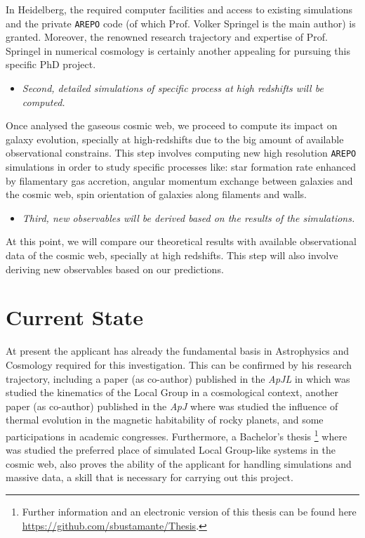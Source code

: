 \documentclass[a4,useAMS,usenatbib,usegraphicx,12pt]{article}
\begin{document}
In Heidelberg, the required computer facilities and access to existing 
simulations and the private \texttt{AREPO} code (of which Prof. Volker 
Springel is the main author) is granted. Moreover, the renowned research 
trajectory and expertise of Prof. Springel in numerical cosmology is 
certainly another appealing for pursuing this specific PhD project.


\begin{itemize}

\item[\checkmark] \textit{Second, detailed simulations of specific process at
high redshifts will be computed.}

\end{itemize}


Once analysed the gaseous cosmic web, we proceed to compute its impact on 
galaxy evolution, specially at high-redshifts due to the big amount of 
available observational constrains. This step involves computing new high 
resolution \texttt{AREPO} simulations in order to study specific processes 
like: star formation rate enhanced by filamentary gas accretion, angular 
momentum exchange between galaxies and the cosmic web, spin orientation of 
galaxies along filaments and walls.


\begin{itemize}

\item[\checkmark] \textit{Third, new observables will be derived based on the
results of the simulations. }

\end{itemize}


At this point, we will compare our theoretical results with available 
observational data of the cosmic web, specially at high redshifts. This step 
will also involve deriving new observables based on our predictions.


\section{Current State}


At present the applicant has already the fundamental basis in Astrophysics and
Cosmology required for this investigation. This can be confirmed by his research
trajectory, including a paper (as co-author) published in the \textit{ApJL} in 
which was studied the kinematics of the Local Group in a cosmological context, 
another paper (as co-author) published in the \textit{ApJ} where was studied 
the influence of thermal evolution in the magnetic habitability of rocky planets, 
and some participations in academic congresses. Furthermore, a Bachelor's thesis
\footnote{\scriptsize Further information and an electronic version of this 
thesis can be found here \url{https://github.com/sbustamante/Thesis}.} where was 
studied the preferred place of simulated Local Group-like systems in the cosmic 
web, also proves the ability of the applicant for handling simulations and massive 
data, a skill that is necessary for carrying out this project.
\end{document}
